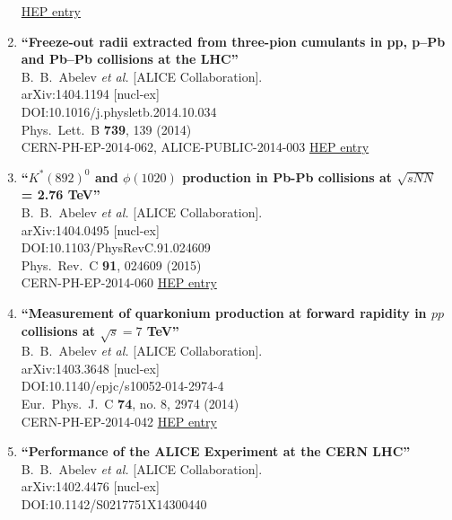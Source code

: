 \begin{enumerate}
\href{http://inspirehep.net/record/1294934}{HEP entry}
\item%
{\bf ``Freeze-out radii extracted from three-pion cumulants in pp, p–Pb and Pb–Pb collisions at the LHC''}
  \\{}B.~B.~Abelev {\it et al.} [ALICE Collaboration].
  \\{}arXiv:1404.1194 [nucl-ex]
  \\{}DOI:10.1016/j.physletb.2014.10.034
  \\{}Phys.\ Lett.\ B {\bf 739}, 139 (2014)
  \\{}CERN-PH-EP-2014-062, ALICE-PUBLIC-2014-003
\href{http://inspirehep.net/record/1288705}{HEP entry}
\item%
{\bf ``$K^*(892)^0$ and $ϕ(1020)$ production in Pb-Pb collisions at $\sqrt{s{NN}}$ = 2.76 TeV''}
  \\{}B.~B.~Abelev {\it et al.} [ALICE Collaboration].
  \\{}arXiv:1404.0495 [nucl-ex]
  \\{}DOI:10.1103/PhysRevC.91.024609
  \\{}Phys.\ Rev.\ C {\bf 91}, 024609 (2015)
  \\{}CERN-PH-EP-2014-060
\href{http://inspirehep.net/record/1288320}{HEP entry}
\item%
{\bf ``Measurement of quarkonium production at forward rapidity in $pp$ collisions at $\sqrt{s} = 7$ TeV''}
  \\{}B.~B.~Abelev {\it et al.} [ALICE Collaboration].
  \\{}arXiv:1403.3648 [nucl-ex]
  \\{}DOI:10.1140/epjc/s10052-014-2974-4
  \\{}Eur.\ Phys.\ J.\ C {\bf 74}, no. 8, 2974 (2014)
  \\{}CERN-PH-EP-2014-042
\href{http://inspirehep.net/record/1285950}{HEP entry}
\item%
{\bf ``Performance of the ALICE Experiment at the CERN LHC''}
  \\{}B.~B.~Abelev {\it et al.} [ALICE Collaboration].
  \\{}arXiv:1402.4476 [nucl-ex]
  \\{}DOI:10.1142/S0217751X14300440

\end{enumerate}
